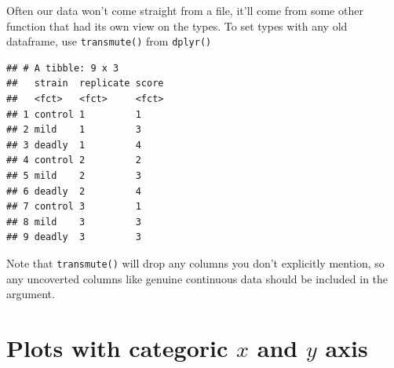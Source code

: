 \documentclass[
]{book}
\newenvironment{Shaded}{\begin{snugshade}}{\end{snugshade}}
\newcommand{\DataTypeTok}[1]{\textcolor[rgb]{0.13,0.29,0.53}{#1}}
\newcommand{\KeywordTok}[1]{\textcolor[rgb]{0.13,0.29,0.53}{\textbf{#1}}}
\newcommand{\NormalTok}[1]{#1}
\newcommand{\OperatorTok}[1]{\textcolor[rgb]{0.81,0.36,0.00}{\textbf{#1}}}
\newcommand{\StringTok}[1]{\textcolor[rgb]{0.31,0.60,0.02}{#1}}
\begin{document}
Often our data won't come straight from a file, it'll come from some other function that had its own view on the types. To set types with any old dataframe, use \texttt{transmute()} from \texttt{dplyr()}

\begin{Shaded}
\end{Shaded}

\begin{verbatim}
## # A tibble: 9 x 3
##   strain  replicate score
##   <fct>   <fct>     <fct>
## 1 control 1         1    
## 2 mild    1         3    
## 3 deadly  1         4    
## 4 control 2         2    
## 5 mild    2         3    
## 6 deadly  2         4    
## 7 control 3         1    
## 8 mild    3         3    
## 9 deadly  3         3
\end{verbatim}

Note that \texttt{transmute()} will drop any columns you don't explicitly mention, so any uncoverted columns like genuine continuous data should be included in the argument.

\begin{Shaded}
\end{Shaded}

\hypertarget{plots-with-categoric-x-and-y-axis}{%
\section{\texorpdfstring{Plots with categoric \(x\) and \(y\) axis}{Plots with categoric x and y axis}}\label{plots-with-categoric-x-and-y-axis}}
\end{document}
